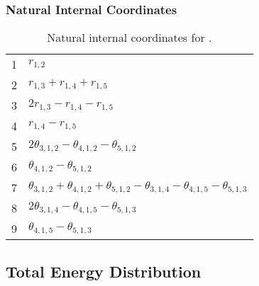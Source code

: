 \documentclass[10pt,oneside]{article}
\begin{document}
\begin{table}[h!]
\subsubsection*{Natural Internal Coordinates}
\centering
\caption{Natural internal coordinates for .}
\small
\begin{tabular}{ll}
\toprule
  1   & $r_{1,2}$ \\
  2   & $r_{1,3} + r_{1,4} + r_{1,5}$ \\
  3   & $2r_{1,3} - r_{1,4} - r_{1,5}$ \\
  4   & $r_{1,4} - r_{1,5}$ \\
  5   & $2\theta_{3,1,2} - \theta_{4,1,2} - \theta_{5,1,2}$ \\
  6   & $\theta_{4,1,2} - \theta_{5,1,2}$ \\
  7   & $\theta_{3,1,2} + \theta_{4,1,2} + \theta_{5,1,2} - \theta_{3,1,4} - \theta_{4,1,5} - \theta_{5,1,3}$ \\
  8   & $2\theta_{3,1,4} - \theta_{4,1,5} - \theta_{5,1,3}$ \\
  9   & $\theta_{4,1,5} - \theta_{5,1,3}$ \\
\bottomrule
\end{tabular}
\end{table}

\begin{table}
\subsection*{Total Energy Distribution}
\centering\end{table}

\clearpage

\subsection{}
\end{document}
